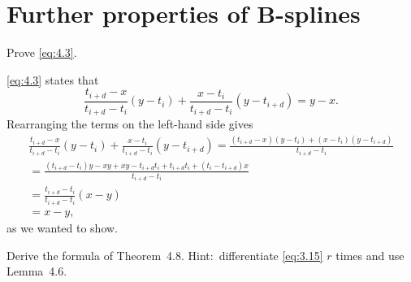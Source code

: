 \section{Further properties of B-splines}

\begin{exercise}
    Prove \eqref{eq:4.3}. %
\end{exercise}

\begin{solution}
    \cref{eq:4.3} states that
    \begin{equation}\label{eq:4.3}
        \frac{t_{i+d} - x}{t_{i+d} - t_i} (y - t_{i}) + \frac{x - t_i}{t_{i+d} - t_i} (y - t_{i+d}) = y - x.
        \tag{4.3}
    \end{equation}
    Rearranging the terms on the left-hand side gives
    \begin{gather*}
        \frac{t_{i+d} - x}{t_{i+d} - t_i} (y - t_{i}) + \frac{x - t_i}{t_{i+d} - t_i} (y - t_{i+d})
        = \frac{(t_{i+d} - x)(y - t_i) + (x - t_i)(y - t_{i+d})}{t_{i+d} - t_i} \\
        = \frac{
            (t_{i+d} - t_i) y - xy + xy - t_{i+d} t_i + t_{i+d} t_i + (t_i - t_{i+d}) x
        }{t_{i+d} - t_i} \\
        = \frac{t_{i+d} - t_i}{t_{i+d} - t_i} (x - y) \\
        = x - y,
    \end{gather*}
    as we wanted to show.
\end{solution}

\begin{exercise}
    Derive the formula of Theorem~4.8.
    Hint:\ differentiate \eqref{eq:3.15} $r$ times and use Lemma~4.6. %
\end{exercise}


